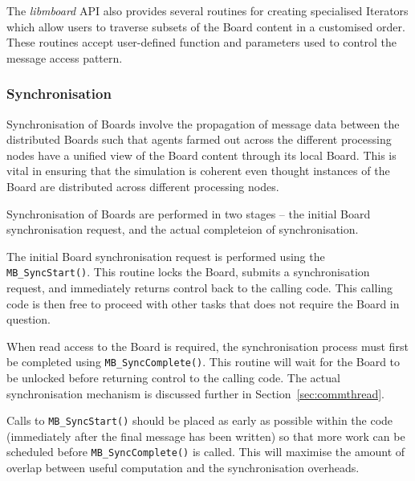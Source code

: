 The \textit{libmboard} API also provides several routines for creating specialised Iterators which allow users to traverse subsets of the Board content in a customised order. These routines accept user-defined function and parameters used to control the message access pattern. 



\subsubsection{Synchronisation}
\label{sec:mb_sync}

Synchronisation of Boards involve the propagation of message data between the distributed Boards such that agents farmed out across the different processing nodes have a unified view of the Board content through its local Board. This is vital in ensuring that the simulation is coherent even thought instances of the Board are distributed across different processing nodes.

Synchronisation of Boards are performed in two stages -- the initial Board synchronisation request, and the actual completeion of synchronisation.

The initial Board synchronisation request is performed using the \texttt{MB\_SyncStart()}. This routine locks the Board, submits a synchronisation request, and immediately returns control back to the calling code. This calling code is then free to proceed with other tasks that does not require the Board in question. 

When read access to the Board is required, the synchronisation process must first be completed using \texttt{MB\_SyncComplete()}. This routine will wait for the Board to be unlocked before returning control to the calling code. The actual synchronisation mechanism is discussed further in Section~\ref{sec:commthread}.

Calls to \texttt{MB\_SyncStart()} should be placed as early as possible within the code (immediately after the final message has been written) so that more work can be scheduled before \texttt{MB\_SyncComplete()} is called. This will maximise the amount of overlap between useful computation and the synchronisation overheads.

